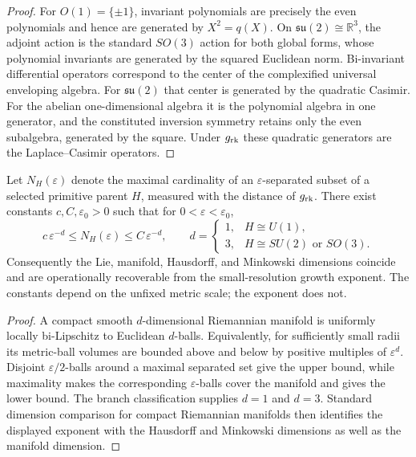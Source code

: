 \documentclass[11pt,a4paper]{article}
\begin{document}
\begin{proof}
For \(O(1)=\{\pm1\}\), invariant polynomials are precisely the even
polynomials and hence are generated by \(X^2=q(X)\).  On
\(\mathfrak{su}(2)\cong\mathbb R^3\), the adjoint action is the standard
\(SO(3)\) action for both global forms, whose polynomial invariants are generated by the squared
Euclidean norm.  Bi-invariant differential operators correspond to the center
of the complexified universal enveloping algebra.  For \(\mathfrak{su}(2)\)
that center is generated by the quadratic Casimir.  For the abelian
one-dimensional algebra it is the polynomial algebra in one generator, and
the constituted inversion symmetry retains only the even subalgebra, generated by the
square.  Under \(g_{\rm rk}\) these quadratic generators are the
Laplace--Casimir operators.
\end{proof}

\begin{theorem}
\label{p2:thm:resolution-growth-dimension}
Let \(N_H(\varepsilon)\) denote the maximal cardinality of an
\(\varepsilon\)-separated subset of a selected primitive parent \(H\), measured
with the distance of \(g_{\rm rk}\).  There exist constants
\(c,C,\varepsilon_0>0\) such that for
\(0<\varepsilon<\varepsilon_0\),
\[
 c\,\varepsilon^{-d}
 \leq N_H(\varepsilon)
 \leq C\,\varepsilon^{-d},
 \qquad
 d=
 \begin{cases}
 1,&H\cong U(1),\\
 3,&H\cong SU(2)\text{ or }SO(3).
 \end{cases}
\]
Consequently the Lie, manifold, Hausdorff, and Minkowski dimensions coincide
and are operationally recoverable from the small-resolution growth exponent.
The constants depend on the unfixed metric scale; the exponent does not.
\end{theorem}

\begin{proof}
A compact smooth \(d\)-dimensional Riemannian manifold is uniformly locally
bi-Lipschitz to Euclidean \(d\)-balls.  Equivalently, for sufficiently small
radii its metric-ball volumes are bounded above and below by positive
multiples of \(\varepsilon^d\).  Disjoint
\(\varepsilon/2\)-balls around a maximal separated set give the upper bound,
while maximality makes the corresponding \(\varepsilon\)-balls cover the
manifold and gives the lower bound.  The branch classification supplies
\(d=1\) and \(d=3\).  Standard dimension comparison for compact Riemannian
manifolds then identifies the displayed exponent with the Hausdorff and
Minkowski dimensions as well as the manifold dimension.
\end{proof}
\end{document}
